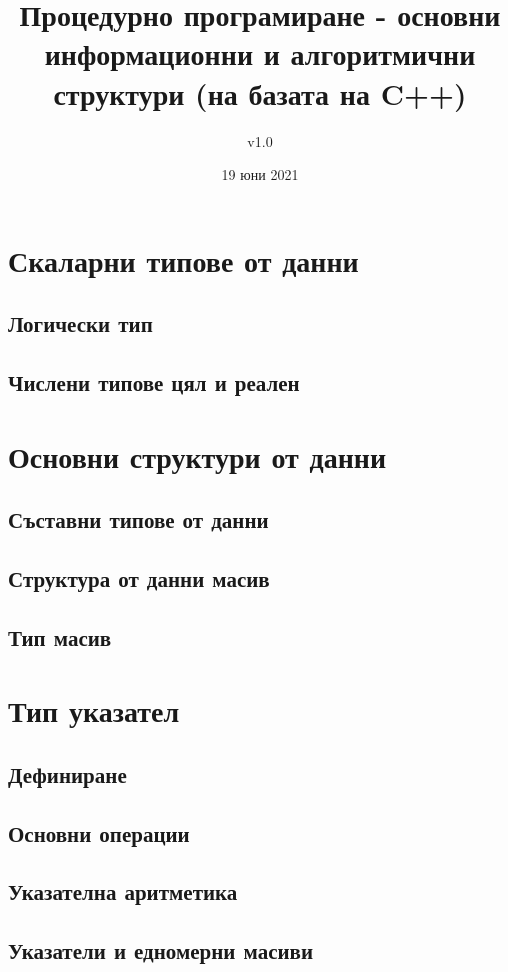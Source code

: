 \documentclass[fleqn,12pt]{article}
\title{Процедурно програмиране - основни информационни и алгоритмични структури (на базата на C++)}
\author{v1.0}
\date{19 юни 2021}
\begin{document}
\maketitle

\tableofcontents
\pagebreak

\section{Скаларни типове от данни}
\subsection{Логически тип}
\subsection{Числени типове цял и реален}

\section{Основни структури от данни}
\subsection{Съставни типове от данни}
\subsection{Структура от данни масив}
\subsection{Тип масив}

\section{Тип указател}
\subsection{Дефиниране}
\subsection{Основни операции}
\subsection{Указателна аритметика}
\subsection{Указатели и едномерни масиви}
\end{document}
